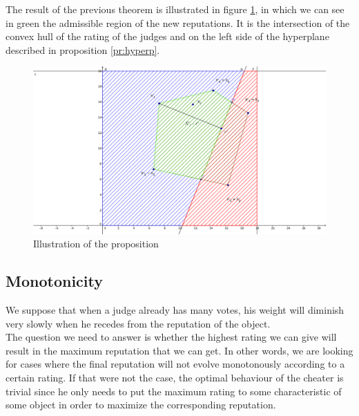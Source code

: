 \documentclass[12pt,a4paper]{article}
\begin{document}
The result of the previous theorem is illustrated in figure \ref{hyperp}, in which we can see in green the admissible region of the new reputations. It is the intersection of the convex hull of the rating of the judges and on the left side of the hyperplane
described in proposition \ref{pr:hyperp}.
\begin{figure}[h!]
\centering
\includegraphics[width = 12cm]{geogebra/Hyperplane.png}
\caption{\label{hyperp}Illustration of the proposition}
\end{figure}
\FloatBarrier
\subsection{Monotonicity}
We suppose that when a judge already has many votes, his weight will diminish very slowly when he recedes from the reputation of the object.\\
The question we need to answer is whether the highest rating we can give will result in the maximum reputation that we can get. In other words, we are looking for cases where the final reputation will not evolve monotonously according to a certain rating. If that were not the case, the optimal behaviour of the cheater is trivial since he only needs to put the maximum rating to some characteristic of some object in order to maximize the corresponding reputation.\\
\end{document}
